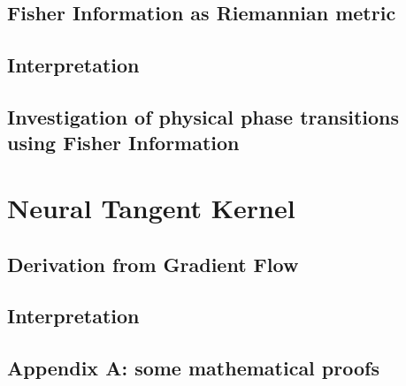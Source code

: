 \documentclass[12pt, a4paper]{report}
\begin{document}
	\section{Fisher Information as Riemannian metric}
	
	\section{Interpretation}
	
	\section{Investigation of physical phase transitions using Fisher Information}
	
	
	
	\chapter{Neural Tangent Kernel}
	\section{Derivation from Gradient Flow}
	
	\section{Interpretation}
	
	
	
	
	\nocite{*}
	\printbibliography[title=Literature]
	\begin{appendices}
		\chapter{Appendix A: some mathematical proofs}
		
	\end{appendices}
	
\end{document}
